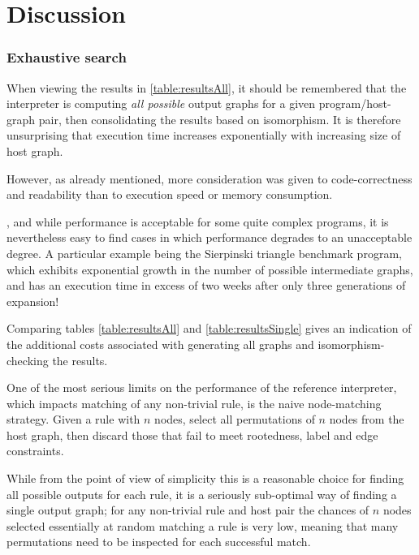 
\section{Discussion}





\subsubsection*{Exhaustive search}

When viewing the results in \ref{table:resultsAll}, it should be remembered that the interpreter is computing \textit{all possible} output graphs for a given program/host-graph pair, then consolidating the results based on isomorphism. It is therefore unsurprising that execution time increases exponentially with increasing size of host graph.

However, as already mentioned, more consideration was given to code-correctness and readability than to execution speed or memory consumption.

, and while performance is acceptable for some quite complex programs, it is nevertheless easy to find cases in which performance degrades to an unacceptable degree. A particular example being the Sierpinski triangle benchmark program, which exhibits exponential growth in the number of possible intermediate graphs, and has an execution time in excess of two weeks after only three generations of expansion!

Comparing tables \ref{table:resultsAll} and \ref{table:resultsSingle} gives an indication of the additional costs associated with generating all graphs and isomorphism-checking the results.

One of the most serious limits on the performance of the reference interpreter, which impacts matching of any non-trivial rule, is the naive node-matching strategy. Given a rule with $n$ nodes, select all permutations of $n$ nodes from the host graph, then discard those that fail to meet rootedness, label and edge constraints.

While from the point of view of simplicity this is a reasonable choice for finding all possible outputs for each rule, it is a seriously sub-optimal way of finding a single output graph; for any non-trivial rule and host pair the chances of $n$ nodes selected essentially at random matching a rule is very low, meaning that many permutations need to be inspected for each successful match.

